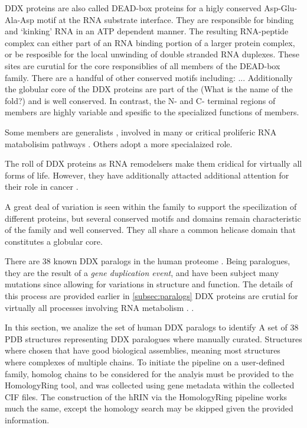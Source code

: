 DDX proteins are also called DEAD-box proteins for a higly conserved Asp-Glu-Ala-Asp motif at the RNA substrate interface.
They are responsible for binding and `kinking' RNA in an ATP dependent manner. 
The resulting RNA-peptide complex can either part of an RNA binding portion of a larger protein complex, or be resposible for the local unwinding of double stranded RNA duplexes. 
These sites are curutial for the core responsiblies of all members of the DEAD-box family. There are a handful of other conserved motifs including: ...
Additionally the globular core of the DDX proteins are part of the (What is the name of the fold?) and is well conserved. 
In contrast, the N- and C- terminal regions of members are highly variable and spesific to the specialized functions of members.

Some members are generalists , involved in many or critical proliferic RNA matabolisim pathways .
Others adopt a more specialaized role.


The roll of DDX proteins as RNA remodelsers make them cridical for virtually all forms of life. However, they have additionally attacted additional attention for their role in cancer \cite{genes12101471}. 

A great deal of variation is seen within the family to support the specilization of different proteins, but several conserved motifs and domains remain characteristic of the family and well conserved. 
They all share a common helicase domain that constitutes a globular core.

There are 38 known DDX paralogs in the human proteome \cite{placeholder}. Being paralogues, they are the result of a \emph{gene duplication event}, and have been subject many mutations since allowing for variations in structure and function. The details of this process are provided earlier in \ref{subsec:paralogs} DDX proteins are crutial for virtually all processes involving RNA metabolism \cite{placeholder}. . 

In this section, we analize the set of human DDX paralogs to identify 
A set of 38  PDB structures representing DDX paralogues where manually curated. Structures where chosen that have good biological assemblies, meaning most structures where complexes of multiple chains. To initiate the pipeline on a user-defined family, homolog chains to be considered for the analyis must be provided to the HomologyRing tool, and was collected using gene metadata within the collected CIF files. 
The construction of the hRIN via the HomologyRing pipeline works much the same, except the homology search may be skipped given the provided information. 

